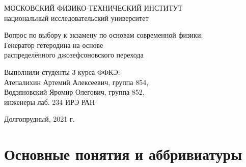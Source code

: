 \documentclass[12pt,a4paper]{article}
\begin{document}
\begin{titlepage}
  \begin{center}
    \Large МОСКОВСКИЙ ФИЗИКО-ТЕХНИЧЕСКИЙ ИНСТИТУТ\\
    \large национальный исследовательский университет
    \vspace{0.5cm}
   
    \vspace{0.25cm}
 
    \vfill
 
    \vfill

    \large{Вопрос по выбору к экзамену по основам современной физики:}\\[2mm]
    
    {\LARGE Генератор гетеродина на основе\\
    распределённого джозефсоновского перехода}

    \vfill
    
\end{center}

\vfill
\vfill
\vfill

\begin{flushright}

    Выполнили студенты 3 курса ФФКЭ:\\
    Атепалихин Артемий Алексеевич, группа 854,\\
    Водзяновский Яромир Олегович, группа 852,\\
    инженеры лаб. 234 ИРЭ РАН

\end{flushright}
\bigskip


\vfill

\begin{center}
  Долгопрудный, 2021 г.
\end{center}
\end{titlepage}

\pagestyle{fancy} 
    \fancyfoot[C]{ \noindent\rule{\textwidth}{0.4pt} \thepage }

\newpage

\tableofcontents

\newpage

\section{Основные понятия и аббривиатуры}
\end{document}
